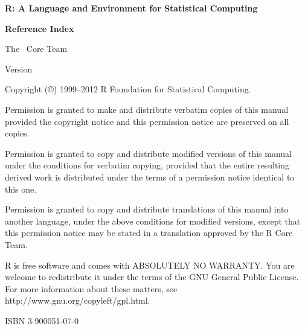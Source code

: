 \documentclass[a4paper]{book}
\begin{document}

\begin{titlepage}
  \strut\vfill

  \begin{center}
    \Huge
    \textbf{R: A Language and Environment for Statistical Computing}

    \LARGE
    \par\vspace*{6\medskipamount}
    \textbf{Reference Index}

    \par\vspace*{6\medskipamount}
    The \R\ Core Team

    \large
    \par\vspace*{3\medskipamount}
    Version 
  \end{center}

  \vfill
  \vfill
  \noindent
  Copyright ({\copyright}) 1999--2012 R Foundation for Statistical Computing.

  \noindent
  Permission is granted to make and distribute verbatim copies of this
  manual provided the copyright notice and this permission notice are
  preserved on all copies.

  \noindent
  Permission is granted to copy and distribute modified versions of this
  manual under the conditions for verbatim copying, provided that the
  entire resulting derived work is distributed under the terms of a
  permission notice identical to this one.

  \noindent
  Permission is granted to copy and distribute translations of this manual
  into another language, under the above conditions for modified versions,
  except that this permission notice may be stated in a translation
  approved by the R Core Team.

  \par\bigskip\noindent
  R is free software and comes with ABSOLUTELY NO WARRANTY.  You are
  welcome to redistribute it under the terms of the GNU General Public
  License.  For more information about these matters, see
  \textsf{http://www.gnu.org/copyleft/gpl.html}.
  \par\bigskip\noindent
  ISBN 3-900051-07-0
\end{titlepage}

\tableofcontents
\cleardoublepage














\cleardoublepage
\printindex
\end{document}
